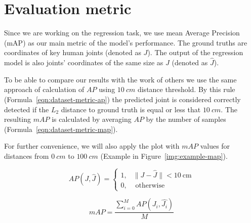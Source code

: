 \section{Evaluation metric}
\label{evaluation-metric}
Since we are working on the regression task, we use mean Average Precision (mAP) as our main metric of the model's performance. The ground truths are coordinates of key human joints (denoted as $J$). The output of the regression model is also joints' coordinates of the same size as $J$ (denoted as $\hat{J}$).

To be able to compare our results with the work of others \parencite{haque_towards_2016,moon_v2v-posenet_2018,guo_towards_2017} we use the same approach of calculation of $AP$ using $10 \ cm$ distance threshold. By this rule (Formula~\ref{eqn:dataset-metric-ap}) the predicted joint is considered correctly detected if the $L_2$ distance to ground truth is equal or less that $10 \ cm$. The resulting $mAP$ is calculated by averaging $AP$ by the number of samples (Formula~\ref{eqn:dataset-metric-map}).

For further convenience, we will also apply the plot with $mAP$ values for distances from $0 \ cm$ to $100 \ cm$ (Example in Figure~\ref{img:example-map}).

\begin{equation}
\label{eqn:dataset-metric-ap}
AP(J, \hat{J})=\left\{\begin{array}{ll}
    1, & \lVert J - \hat{J} \rVert <10 \mathrm{~cm} \\
    0, & \text { otherwise }
\end{array}\right.
\end{equation}

\begin{equation}
\label{eqn:dataset-metric-map}
    mAP=\frac{\sum_{i=0}^{M} A P\left(J_{i}, \hat{J_{i}}\right)}{M}
\end{equation}

